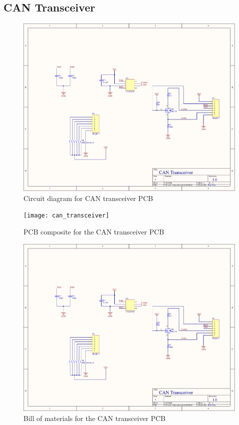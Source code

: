 \begin{flushleft}
\section{CAN Transceiver}
\end{flushleft}
\label{app:can_transceiver}
\begin{figure}[H]
	\centering
	\includegraphics[page=1,scale=0.8,angle=270]{PDFs/can_transceiver.PDF}
	\caption{Circuit diagram for CAN transceiver PCB}
	\label{fig:can_transceiver_circuit}
\end{figure}
\begin{figure}[H]
	\centering
	\texttt{[image: can\_transceiver]} 
	\caption{PCB composite for the CAN transceiver PCB}
	\label{fig:can_transceiver_pcb}
\end{figure}
\begin{figure}[H]
	\centering
	\includegraphics[page=3,width=\textwidth]{PDFs/can_transceiver.PDF} 
	\caption{Bill of materials for the CAN transceiver PCB}
	\label{fig:can_transceiver_bom}
\end{figure}
